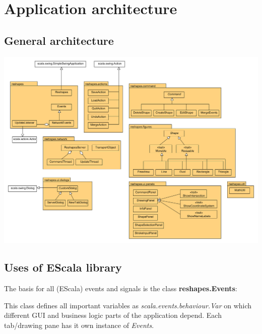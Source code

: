 \chapter{Application architecture}

\section{General architecture}

\includegraphics[width=1\textwidth]{img/class_diagram}

\section{Uses of EScala library}

The basis for all (EScala) events and signals is the class \textbf{reshapes.Events}: 



This class defines all important variables as \textit{scala.events.behaviour.Var} on which different GUI and business logic parts of the application depend. 
Each tab/drawing pane has it own instance of \textit{Events}.
